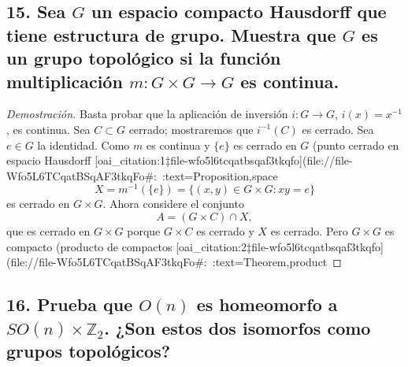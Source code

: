 \documentclass{article}
\begin{document}
\subsection*{15. Sea $G$ un espacio compacto Hausdorff que tiene estructura de grupo. Muestra que $G$ es un grupo topológico si la función multiplicación $m:G\times G\to G$ es continua.}

\begin{proof}[Demostración]
Basta probar que la aplicación de inversión $i:G\to G$, $i(x)=x^{-1}$, es continua. Sea $C\subset G$ cerrado; mostraremos que $i^{-1}(C)$ es cerrado. Sea $e\in G$ la identidad. Como $m$ es continua y $\{e\}$ es cerrado en $G$ (punto cerrado en espacio Hausdorff [oai_citation:1‡file-wfo5l6tcqatbsqaf3tkqfo](file://file-Wfo5L6TCqatBSqAF3tkqFo#:~:text=Proposition,space%
\[
X=m^{-1}(\{e\})=\{(x,y)\in G\times G:xy=e\}
\]
es cerrado en $G\times G$. Ahora considere el conjunto 
\[
A=(G\times C)\cap X,
\]
que es cerrado en $G\times G$ porque $G\times C$ es cerrado y $X$ es cerrado. Pero $G\times G$ es compacto (producto de compactos [oai_citation:2‡file-wfo5l6tcqatbsqaf3tkqfo](file://file-Wfo5L6TCqatBSqAF3tkqFo#:~:text=Theorem,product%
\end{proof}

\subsection*{16. Prueba que $O(n)$ es homeomorfo a $SO(n)\times \mathbb{Z}_2$. ¿Son estos dos isomorfos como grupos topológicos?}
\end{document}
